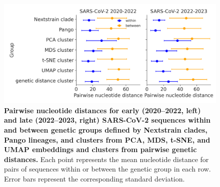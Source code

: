 \begin{figure}[!h]
\includegraphics[width=\columnwidth]{figures/within_between_sars.png}
\caption{{\bf Pairwise nucleotide distances for early (2020--2022, left) and late (2022--2023, right) SARS-CoV-2 sequences within and between genetic groups defined by Nextstrain clades, Pango lineages, and clusters from PCA, MDS, t-SNE, and UMAP embeddings and clusters from pairwise genetic distances.}
  Each point represents the mean nucleotide distance for pairs of sequences within or between the genetic group in each row.
  Error bars represent the corresponding standard deviation.}\label{S_Fig_sarscov2_within_between_group_distances}
\end{figure}

